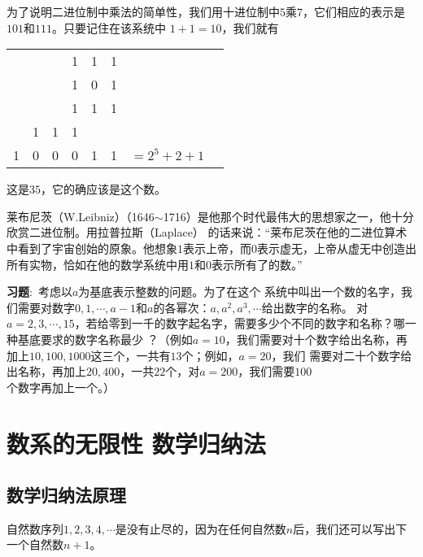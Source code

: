 为了说明二进位制中乘法的简单性，我们用十进位制中$5$乘$7$，它们相应的表示是$101$和$111$。只要记住在该系统中
$1+1=10$，我们就有
\begin{center}
\begin{tabular}{ccccccccc}
  &  &  & 1 & 1 & 1 &  &  &   \\
  &  &  & 1 & 0 & 1 &  &  &   \\
\cline{1-7}
  &  &  & 1 & 1 & 1 &  &  &   \\
  & 1 & 1 & 1 &  &  &  &  &   \\
\cline{1-7}
 1& 0 & 0 & 0 & 1 & 1 &  \multicolumn{2}{c}{$=2^5+2+1$}  
\end{tabular}
\end{center}
这是$35$，它的确应该是这个数。

莱布尼茨（W.Leibniz）（1646$\sim$1716）是他那个时代最伟大的思想家之一，他十分欣赏二进位制。用拉普拉斯（Laplace）
的话来说：“莱布尼茨在他的二进位算术中看到了宇宙创始的原象。他想象$1$表示上帝，而$0$表示虚无，上帝从虚无中创造出
所有实物，恰如在他的数学系统中用$1$和$0$表示所有了的数。”
\begin{spacing}{2.0}
\end{spacing}

\setlength{\hangindent}{2em}
\qquad \textbf{习题}:\, {\footnotesize 考虑以$a$为基底表示整数的问题。为了在这个
系统中叫出一个数的名字，我们需要对数字$0,1,\cdots,a-1$和$a$的各幂次：$a,a^2,a^3,\cdots$给出数字的名称。
对$a=2,3,\cdots,15$，若给零到一千的数字起名字，需要多少个不同的数字和名称？哪一种基底要求的数字名称最少
？（例如$a=10$，我们需要对十个数字给出名称，再加上$10,100,1000$这三个，一共有$13$个；例如，$a=20$，我们
需要对二十个数字给出名称，再加上$20,400$，一共$22$个，对$a=200$，我们需要$100$个数字再加上一个。）}

\section{数系的无限性 \hspace{1em} 数学归纳法}
\subsection{数学归纳法原理}
自然数序列$1,2,3,4,\cdots$是没有止尽的，因为在任何自然数$n$后，我们还可以写出下一个自然数$n+1$。